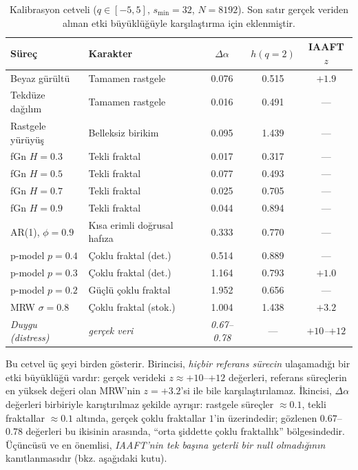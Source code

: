 \documentclass[11pt,a4paper]{article}
\newcommand{\Dal}{\Delta\alpha}
\begin{document}
\begin{table}[H]
\centering
\caption{Kalibrasyon cetveli ($q\in[-5,5]$, $s_{\min}=32$, $N=8192$). Son
satır gerçek veriden alınan etki büyüklüğüyle karşılaştırma için
eklenmiştir.}
\label{tab:calib}
\begin{tabular}{llccc}
\toprule
Süreç & Karakter & $\Dal$ & $h(q{=}2)$ & IAAFT $z$\\
\midrule
Beyaz gürültü & Tamamen rastgele & 0.076 & 0.515 & $+1.9$\\
Tekdüze dağılım & Tamamen rastgele & 0.016 & 0.491 & ---\\
Rastgele yürüyüş & Belleksiz birikim & 0.095 & 1.439 & ---\\
fGn $H{=}0.3$ & Tekli fraktal & 0.017 & 0.317 & ---\\
fGn $H{=}0.5$ & Tekli fraktal & 0.077 & 0.493 & ---\\
fGn $H{=}0.7$ & Tekli fraktal & 0.025 & 0.705 & ---\\
fGn $H{=}0.9$ & Tekli fraktal & 0.044 & 0.894 & ---\\
AR(1), $\phi{=}0.9$ & Kısa erimli doğrusal hafıza & 0.333 & 0.770 & ---\\
p-model $p{=}0.4$ & Çoklu fraktal (det.) & 0.514 & 0.889 & ---\\
p-model $p{=}0.3$ & Çoklu fraktal (det.) & 1.164 & 0.793 & $+1.0$\\
p-model $p{=}0.2$ & Güçlü çoklu fraktal & 1.952 & 0.656 & ---\\
MRW $\sigma{=}0.8$ & Çoklu fraktal (stok.) & 1.004 & 1.438 & $+3.2$\\
\midrule
\emph{Duygu (distress)} & \emph{gerçek veri} & \emph{0.67--0.78} & --- & \emph{$+10$--$+12$}\\
\bottomrule
\end{tabular}
\end{table}

Bu cetvel üç şeyi birden gösterir. Birincisi, \emph{hiçbir referans sürecin}
ulaşamadığı bir etki büyüklüğü vardır: gerçek verideki $z\approx +10$--$+12$
değerleri, referans süreçlerin en yüksek değeri olan MRW'nin $z=+3.2$'si ile
bile karşılaştırılamaz. İkincisi, $\Dal$ değerleri birbiriyle karıştırılmaz
şekilde ayrışır: rastgele süreçler $\approx 0.1$, tekli fraktallar $\approx 0.1$
altında, gerçek çoklu fraktallar $1$'in üzerindedir; gözlenen $0.67$--$0.78$ değerleri
bu ikisinin arasında, ``orta şiddette çoklu fraktallık'' bölgesindedir. Üçüncüsü
ve en önemlisi, \emph{IAAFT'nin tek başına yeterli bir null olmadığının}
kanıtlanmasıdır (bkz. aşağıdaki kutu).
\end{document}
